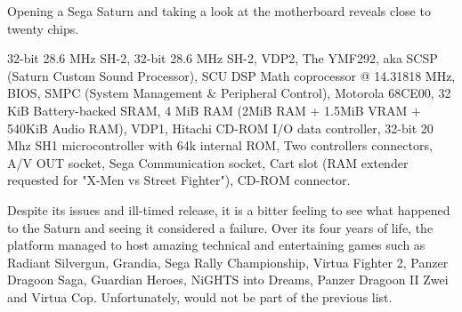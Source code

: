 \pagebreak





\par
Opening a Sega Saturn and taking a look at the motherboard reveals close to twenty chips.\\
\par
{} 32-bit 28.6 MHz SH-2, 
 32-bit 28.6 MHz SH-2, 
 VDP2, 
 The YMF292, aka SCSP (Saturn Custom Sound Processor), 
 SCU DSP Math coprocessor @ 14.31818 MHz, 
 BIOS, 
 SMPC (System Management \& Peripheral Control), 
 Motorola 68CE00, 
 32 KiB Battery-backed SRAM, 
 4 MiB RAM (2MiB RAM + 1.5MiB VRAM + 540KiB Audio RAM), 
 VDP1, 
 Hitachi CD-ROM I/O data controller, 
 32-bit 20 Mhz SH1  microcontroller with 64k internal ROM, 
 Two controllers connectors, 
 A/V OUT socket,  
 Sega Communication socket,  
 Cart slot (RAM extender requested for "X-Men vs Street Fighter"), 
 CD-ROM connector.






Despite its issues and ill-timed release, it is a bitter feeling to see what happened to the Saturn and seeing it considered a failure. Over its four years of life, the platform managed to host amazing technical and entertaining games such as Radiant Silvergun, Grandia, Sega Rally Championship, Virtua Fighter 2, Panzer Dragoon Saga, Guardian Heroes, NiGHTS into Dreams, Panzer Dragoon II Zwei and Virtua Cop. Unfortunately, \doom{} would not be part of the previous list.\\
\par
{}




























